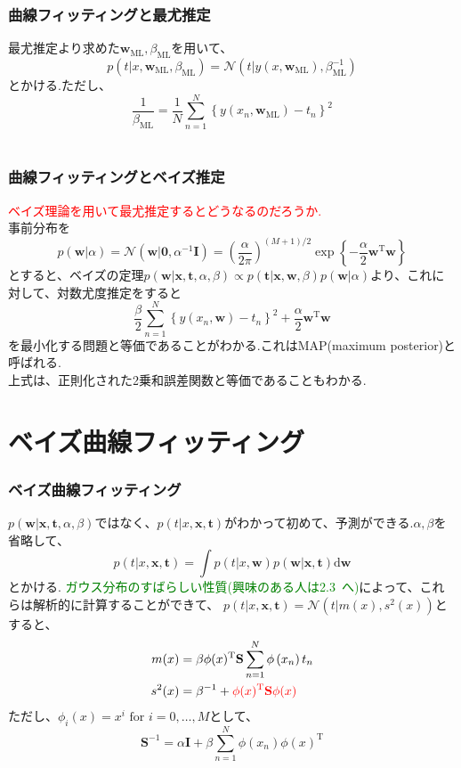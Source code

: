 \documentclass[uplatex,dvipdfmx,11pt,notheorems]{beamer}
\theoremstyle{definition}
\begin{document}
\begin{frame}\frametitle{曲線フィッティングと最尤推定}

	最尤推定より求めた$\mathbf{w}_{\mathrm{ML}},\beta_{\mathrm{ML}}$を用いて、
	$$p\left(t | x, \mathbf{w}_{\mathrm{ML}}, \beta_{\mathrm{ML}}\right)=\mathcal{N}\left(t | y\left(x, \mathbf{w}_{\mathrm{ML}}\right), \beta_{\mathrm{ML}}^{-1}\right)$$
	とかける.ただし、
	$$\frac{1}{\beta_{\mathrm{ML}}}=\frac{1}{N} \sum_{n=1}^{N}\left\{y\left(x_{n}, \mathbf{w}_{\mathrm{ML}}\right)-t_{n}\right\}^{2}$$　
\end{frame}

\begin{frame}\frametitle{曲線フィッティングとベイズ推定}
	\textcolor{red}{ベイズ理論を用いて最尤推定するとどうなるのだろうか.}\\
	事前分布を
	$$p(\mathbf{w} | \alpha)=\mathcal{N}\left(\mathbf{w} | \mathbf{0}, \alpha^{-1} \mathbf{I}\right)=\left(\frac{\alpha}{2 \pi}\right)^{(M+1) / 2} \exp \left\{-\frac{\alpha}{2} \mathbf{w}^{\mathrm{T}} \mathbf{w}\right\}$$
	とすると、ベイズの定理$p(\mathbf{w} | \mathbf{x}, \mathbf{t}, \alpha, \beta) \propto p(\mathbf{t} | \mathbf{x}, \mathbf{w}, \beta) p(\mathbf{w} | \alpha)$より、これに対して、対数尤度推定をすると
	$$\frac{\beta}{2} \sum_{n=1}^{N}\left\{y\left(x_{n}, \mathbf{w}\right)-t_{n}\right\}^{2}+\frac{\alpha}{2} \mathbf{w}^{\mathrm{T}} \mathbf{w}$$
	を最小化する問題と等価であることがわかる.これはMAP(maximum posterior)と呼ばれる.\\
	上式は、正則化された2乗和誤差関数と等価であることもわかる.
\end{frame}

\section{ベイズ曲線フィッティング}
\begin{frame}\frametitle{ベイズ曲線フィッティング}
	$p(\mathbf{w} | \mathbf{x}, \mathbf{t}, \alpha, \beta)$ではなく、$p(t | x, \mathbf{x}, \mathbf{t})$がわかって初めて、予測ができる.$\alpha, \beta$を省略して、
	$$p(t | x, \mathbf{x}, \mathbf{t})=\int p(t | x, \mathbf{w}) p(\mathbf{w} | \mathbf{x}, \mathbf{t}) \mathrm{d} \mathbf{w}$$
	とかける. \textcolor{green}{ガウス分布のすばらしい性質(興味のある人は2.3~へ)}によって、これらは解析的に計算することができて、
	$p(t | x, \mathbf{x}, \mathbf{t})=\mathcal{N}\left(t | m(x), s^{2}(x)\right)$とすると、
	$$\begin{aligned} m(x) &=\beta \phi(x)^{\mathrm{T}} \mathbf{S} \sum_{n=1}^{N} \phi\left(x_{n}\right) t_{n} \\ s^{2}(x) &=\beta^{-1}+\textcolor{red}{\phi(x)^{\mathrm{T}} \mathbf{S} \phi(x)} \end{aligned}$$
	ただし、$\phi_{i}(x)=x^{i} \text { for } i=0, \dots, M$として、
	$$\mathbf{S}^{-1}=\alpha \mathbf{I}+\beta \sum_{n=1}^{N} \phi\left(x_{n}\right) \phi(x)^{\mathrm{T}}$$


\end{frame}
\end{document}
